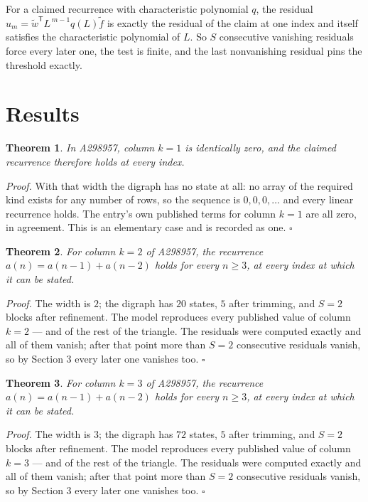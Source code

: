 \documentclass[11pt]{article}
\newtheorem{theorem}{Theorem}
\theoremstyle{definition}
\begin{document}
For a claimed recurrence with characteristic polynomial $q$, the residual $u_m = \tilde w^{\mathsf T}L^{\,m-1}q(L)\tilde f$ is exactly the residual of the claim at one index and itself satisfies the characteristic polynomial of $L$. So $S$ consecutive vanishing residuals force every later one, the test is finite, and the last nonvanishing residual pins the threshold exactly.

\section{Results}

\begin{theorem} In A298957, column $k = 1$ is identically zero, and the claimed recurrence therefore holds at every index.\end{theorem}

{\itshape Proof.} With that width the digraph has no state at all: no array of the required kind exists for any number of rows, so the sequence is $0,0,0,\dots$ and every linear recurrence holds. The entry's own published terms for column $k = 1$ are all zero, in agreement. This is an elementary case and is recorded as one. $\square$

\begin{theorem} For column $k = 2$ of A298957, the recurrence $a(n) = a(n-1) + a(n-2)$ holds for every $n \ge 3$, at every index at which it can be stated.\end{theorem}

{\itshape Proof.} The width is $2$; the digraph has $20$ states, $5$ after trimming, and $S = 2$ blocks after refinement. The model reproduces every published value of column $k = 2$ --- and of the rest of the triangle. The residuals were computed exactly and all of them vanish; after that point more than $S = 2$ consecutive residuals vanish, so by Section 3 every later one vanishes too. $\square$

\begin{theorem} For column $k = 3$ of A298957, the recurrence $a(n) = a(n-1) + a(n-2)$ holds for every $n \ge 3$, at every index at which it can be stated.\end{theorem}

{\itshape Proof.} The width is $3$; the digraph has $72$ states, $5$ after trimming, and $S = 2$ blocks after refinement. The model reproduces every published value of column $k = 3$ --- and of the rest of the triangle. The residuals were computed exactly and all of them vanish; after that point more than $S = 2$ consecutive residuals vanish, so by Section 3 every later one vanishes too. $\square$
\end{document}
